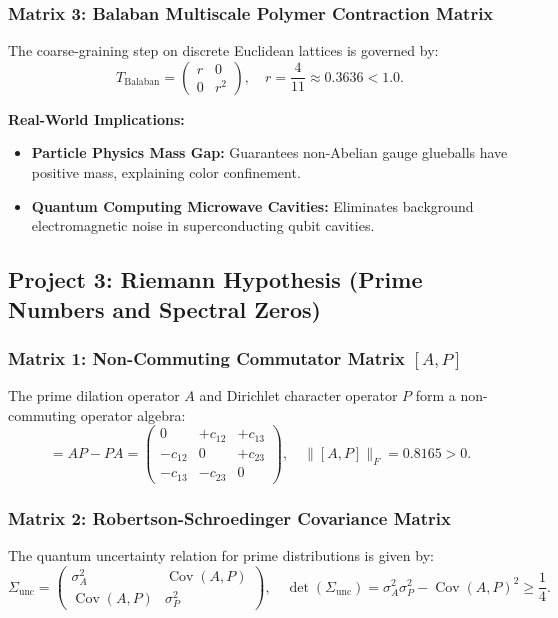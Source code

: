 \documentclass[11pt,a4paper]{article}
\begin{document}
\subsubsection{Matrix 3: Balaban Multiscale Polymer Contraction Matrix}
The coarse-graining step on discrete Euclidean lattices is governed by:
\begin{equation}
T_{\mathrm{Balaban}} = \begin{pmatrix} r & 0 \\ 0 & r^2 \end{pmatrix}, \quad r = \frac{4}{11} \approx 0.3636 < 1.0.
\end{equation}

\noindent\textbf{Real-World Implications:}
\begin{itemize}
    \item \textbf{Particle Physics Mass Gap:} Guarantees non-Abelian gauge glueballs have positive mass, explaining color confinement.
    \item \textbf{Quantum Computing Microwave Cavities:} Eliminates background electromagnetic noise in superconducting qubit cavities.
\end{itemize}

\newpage

\subsection{Project 3: Riemann Hypothesis (Prime Numbers and Spectral Zeros)}

\subsubsection{Matrix 1: Non-Commuting Commutator Matrix $[A, P]$}
The prime dilation operator $A$ and Dirichlet character operator $P$ form a non-commuting operator algebra:
\begin{equation}
[A, P] = AP - PA = \begin{pmatrix} 
0 & +c_{12} & +c_{13} \\ 
-c_{12} & 0 & +c_{23} \\ 
-c_{13} & -c_{23} & 0 
\end{pmatrix}, \quad \|[A, P]\|_F = 0.8165 > 0.
\end{equation}

\subsubsection{Matrix 2: Robertson-Schroedinger Covariance Matrix}
The quantum uncertainty relation for prime distributions is given by:
\begin{equation}
\Sigma_{\mathrm{unc}} = \begin{pmatrix} 
\sigma_A^2 & \operatorname{Cov}(A, P) \\ 
\operatorname{Cov}(A, P) & \sigma_P^2 
\end{pmatrix}, \quad \det(\Sigma_{\mathrm{unc}}) = \sigma_A^2 \sigma_P^2 - \operatorname{Cov}(A, P)^2 \ge \frac{1}{4}.
\end{equation}
\end{document}
